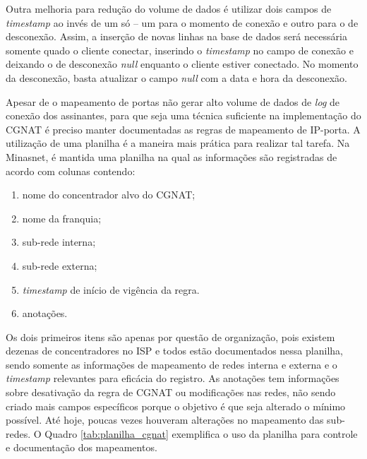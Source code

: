   Outra melhoria para redução do volume de dados é utilizar dois campos de \textit{timestamp} ao invés de um só -- um para o momento de conexão e outro para o de desconexão. Assim, a inserção de novas linhas na base de dados será necessária somente quado o cliente conectar, inserindo o \textit{timestamp} no campo de conexão e deixando o de desconexão \textit{null} enquanto o cliente estiver conectado. No momento da desconexão, basta atualizar o campo \textit{null} com a data e hora da desconexão.
 
   Apesar de o mapeamento de portas não gerar alto volume de dados de \textit{log} de conexão dos assinantes, para que seja uma técnica suficiente na implementação do CGNAT é preciso manter documentadas as regras de mapeamento de IP-porta. A utilização de uma planilha é a maneira mais prática para realizar tal tarefa. Na Minasnet, é mantida uma planilha na qual as informações são registradas de acordo com colunas contendo:

   \begin{enumerate}[label=\alph*)]
       \item nome do concentrador alvo do CGNAT;
       \item nome da franquia;
       \item sub-rede interna;
       \item sub-rede externa;
       \item \textit{timestamp} de início de vigência da regra.
       \item anotações.
   \end{enumerate}
   
   Os dois primeiros itens são apenas por questão de organização, pois existem dezenas de concentradores no ISP e todos estão documentados nessa planilha, sendo somente as informações de mapeamento de redes interna e externa e o \textit{timestamp} relevantes para eficácia do registro. As anotações tem informações sobre desativação da regra de CGNAT ou modificações nas redes, não sendo criado mais campos específicos porque o objetivo é que seja alterado o mínimo possível. Até hoje, poucas vezes houveram alterações no mapeamento das sub-redes. O Quadro \ref{tab:planilha_cgnat} exemplifica o uso da planilha para controle e documentação dos mapeamentos.

